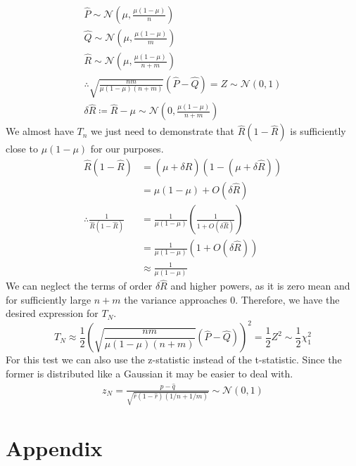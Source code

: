 \documentclass[]{article}
\newcommand{\Gaussian}{\mathcal{N}}
\begin{document}
%
\begin{equation*}
\begin{gathered}
\hat{P} \sim \Gaussian \left( \mu, \frac{\mu(1-\mu)}{n} \right) \\
\hat{Q} \sim \Gaussian \left(\mu, \frac{\mu(1-\mu)}{m} \right) \\
\hat{R} \sim \Gaussian \left(\mu, \frac{\mu(1-\mu)}{n+m} \right) \\
\therefore  \sqrt{\frac{nm}{\mu(1-\mu)(n+m)}} (\hat{P} - \hat{Q}) = Z \sim \Gaussian \left(0, 1 \right) \\
\delta \hat{R} \coloneqq \hat{R} - \mu \sim \Gaussian \left( 0, \frac{\mu(1-\mu)}{n+m} \right)
\end{gathered}
\end{equation*}
%
We almost have $T_n$ we just need to demonstrate that $\hat{R}(1-\hat{R})$ is sufficiently close to $\mu(1-\mu)$ for our purposes.
%
\begin{align*}
\hat{R}(1-\hat{R}) &= (\mu + \delta\hat{R})(1-(\mu + \delta \hat{R})) \\
&= \mu(1-\mu) + O(\delta\hat{R}) \\
\therefore \frac{1}{\hat{R}(1-\hat{R})} &= \frac{1}{\mu(1-\mu)} \left(\frac{1}{1+O(\delta\hat{R})}\right) \\
&= \frac{1}{\mu(1-\mu)} (1 + O(\delta\hat{R})) \\
&\approx \frac{1}{\mu(1-\mu)}
\end{align*}
%
We can neglect the terms of order $\delta\hat{R}$ and higher powers, as it is zero mean and for sufficiently large $n+m$ the variance approaches 0. Therefore, we have the desired expression for $T_N$.
%
\begin{equation}
T_N \approx \frac{1}{2} \left(
\sqrt{\frac{nm}{\mu(1-\mu)(n+m)}}
(\hat{P} - \hat{Q})
\right)^2 = \frac{1}{2} Z^2 \sim \frac{1}{2} \chi^2_1
\end{equation}
%
For this test we can also use the z-statistic instead of the t-statistic. Since the former is distributed like a Gaussian it may be easier to deal with.
\begin{align}
z_N = \frac{\hat{p} - \hat{q}}{\sqrt{\hat{r}(1-\hat{r})\left(1/n + 1/m\right)}} \sim \Gaussian(0, 1)
\end{align}
\section{Appendix}
\end{document}
